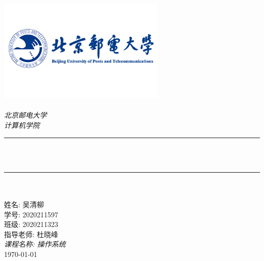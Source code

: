 \begin{titlepage}
	\newcommand{\HRule}{\rule{\linewidth}{0.5mm}}
	\includegraphics[width=8cm]{title/logo_bupt.png}\\[1cm]
	\center
	\quad\\[1.5cm]
	\textsl{\Large 北京邮电大学}\\[0.5cm]
	\textsl{\large  计算机学院}\\[0.5cm]
	\makeatletter
	\HRule \\[0.4cm]
	{\huge \bfseries \@title}\\[0.4cm]
	\HRule \\[0.5cm]
	~\\[1cm] %

	\makeatother
	{\large 姓名: 吴清柳}\\[0.5cm]
	{\large 学号: 2020211597}\\[0.5cm]
	{\large 班级: 2020211323}\\[0.5cm]
	{\large 指导老师: 杜晓峰}\\[0.5cm]
	{\large \emph{课程名称: 操作系统}}\\[0.5cm]
	{\large \today}\\[2cm]
	\vfill
\end{titlepage}
